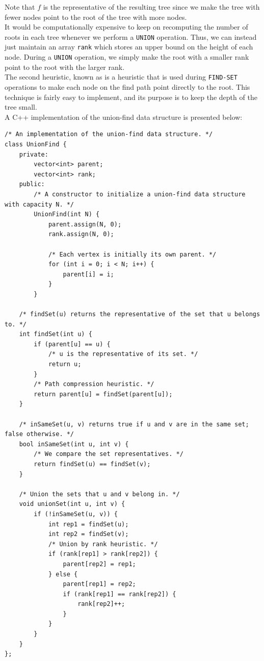 Note that $f$ is the representative of the resulting tree since we make the tree with fewer nodes point to the root of the tree with more nodes. \\

It would be computationally expensive to keep on recomputing the number of roots in each tree whenever we perform a \verb!UNION! operation. Thus, we can instead just maintain an array \verb!rank! which stores an upper bound on the height of each node. During a \verb!UNION! operation, we simply make the root with a smaller rank point to the root with the larger rank. \\


The second heuristic, known as  is a heuristic that is used during \verb!FIND-SET! operations to make each node on the find path point directly to the root. This technique is fairly easy to implement, and its purpose is to keep the depth of the tree small. \\


A C++ implementation of the union-find data structure is presented below:


\begin{lstlisting}
/* An implementation of the union-find data structure. */
class UnionFind {
    private:
        vector<int> parent;
        vector<int> rank;
    public:
        /* A constructor to initialize a union-find data structure with capacity N. */
        UnionFind(int N) {
            parent.assign(N, 0);
            rank.assign(N, 0);
            
            /* Each vertex is initially its own parent. */
            for (int i = 0; i < N; i++) {
                parent[i] = i;
            }
        }
    
    /* findSet(u) returns the representative of the set that u belongs to. */    
    int findSet(int u) {
        if (parent[u] == u) {
            /* u is the representative of its set. */
            return u;
        }
        /* Path compression heuristic. */
        return parent[u] = findSet(parent[u]);
    }
    
    /* inSameSet(u, v) returns true if u and v are in the same set; false otherwise. */
    bool inSameSet(int u, int v) {
        /* We compare the set representatives. */
        return findSet(u) == findSet(v);
    }
    
    /* Union the sets that u and v belong in. */
    void unionSet(int u, int v) {
        if (!inSameSet(u, v)) {
            int rep1 = findSet(u);
            int rep2 = findSet(v);
            /* Union by rank heuristic. */
            if (rank[rep1] > rank[rep2]) {
                parent[rep2] = rep1;    
            } else {
                parent[rep1] = rep2;
                if (rank[rep1] == rank[rep2]) {
                    rank[rep2]++;
                }
            }
        }
    }
};
\end{lstlisting}



